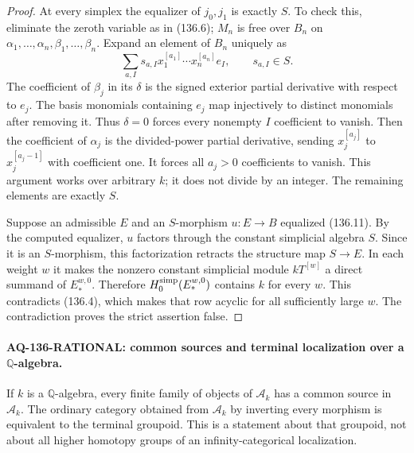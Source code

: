\documentclass[11pt,a4paper]{article}
\theoremstyle{definition}\newtheorem{definition}[theorem]{Definition}
\theoremstyle{remark}\newtheorem{remark}[theorem]{Remark}
\begin{document}
\begin{proof}
At every simplex the equalizer of $j_0,j_1$ is exactly
$S$.  To check this, eliminate the zeroth variable as
in (136.6); $M_n$ is free over $B_n$ on
$\alpha_1,\ldots,\alpha_n,\beta_1,\ldots,\beta_n$.
Expand an element of $B_n$ uniquely as
\[
 \sum_{a,I}s_{a,I}x_1^{[a_1]}\cdots x_n^{[a_n]}e_I,
 \qquad s_{a,I}\in S.
\]
The coefficient of $\beta_j$ in its $\delta$ is the
signed exterior partial derivative with respect to $e_j$.
The basis monomials containing $e_j$ map injectively to
distinct monomials after removing it.  Thus $\delta=0$
forces every nonempty $I$ coefficient to vanish.
Then the coefficient of $\alpha_j$ is the divided-power
partial derivative, sending $x_j^{[a_j]}$ to
$x_j^{[a_j-1]}$ with coefficient one.  It forces all
$a_j>0$ coefficients to vanish.  This argument works
over arbitrary $k$; it does not divide by an integer.
The remaining elements are exactly $S$.

Suppose an admissible $E$ and an $S$-morphism $u:E\to B$
equalized (136.11).  By the computed equalizer, $u$
factors through the constant simplicial algebra $S$.
Since it is an $S$-morphism, this factorization retracts
the structure map $S\to E$.  In each weight $w$ it makes
the nonzero constant simplicial module
$kT^{[w]}$ a direct summand of $E_*^{w,0}$.
Therefore $H_0^{\rm simp}(E_*^{w,0})$ contains $k$ for
every $w$.  This contradicts (136.4), which makes that
row acyclic for all sufficiently large $w$.
The contradiction proves the strict assertion false.
\end{proof}

\paragraph{AQ-136-RATIONAL: common sources and terminal localization over a $\mathbb Q$-algebra.}
If $k$ is a $\mathbb Q$-algebra, every finite family of
objects of $\mathcal A_k$ has a common source in
$\mathcal A_k$.  The ordinary category obtained from
$\mathcal A_k$ by inverting every morphism is equivalent
to the terminal groupoid.  This is a statement about
that groupoid, not about all higher homotopy groups of
an infinity-categorical localization.
\end{document}
